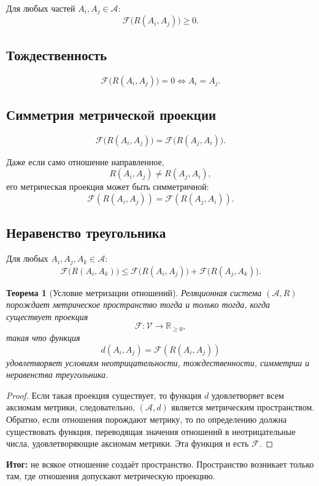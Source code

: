 \documentclass[12pt,a4paper]{article}
\newtheorem{theorem}{Теорема}[section]
\newcommand{\Parts}{\mathcal A}
\newcommand{\Rel}{R}
\newcommand{\Values}{\mathcal V}
\newcommand{\Metric}{\mathcal F}
\begin{document}
Для любых частей \(A_i,A_j\in\Parts\):
\[
\Metric\bigl(\Rel(A_i,A_j)\bigr)\ge0.
\]

\subsection{Тождественность}

\[
\Metric\bigl(\Rel(A_i,A_j)\bigr)=0
\Longleftrightarrow
A_i=A_j.
\]

\subsection{Симметрия метрической проекции}

\[
\Metric\bigl(\Rel(A_i,A_j)\bigr)
=
\Metric\bigl(\Rel(A_j,A_i)\bigr).
\]

Даже если само отношение направленное,
\[
\Rel(A_i,A_j)\neq\Rel(A_j,A_i),
\]
его метрическая проекция может быть симметричной:
\[
\Metric(\Rel(A_i,A_j))=\Metric(\Rel(A_j,A_i)).
\]

\subsection{Неравенство треугольника}

Для любых \(A_i,A_j,A_k\in\Parts\):
\[
\Metric\bigl(\Rel(A_i,A_k)\bigr)
\le
\Metric\bigl(\Rel(A_i,A_j)\bigr)
+
\Metric\bigl(\Rel(A_j,A_k)\bigr).
\]

\begin{theorem}[Условие метризации отношений]
Реляционная система \((\Parts,\Rel)\) порождает метрическое пространство тогда и только тогда, когда существует проекция
\[
\Metric:\Values\to\mathbb R_{\ge0},
\]
такая что функция
\[
d(A_i,A_j)=\Metric(\Rel(A_i,A_j))
\]
удовлетворяет условиям неотрицательности, тождественности, симметрии и неравенства треугольника.
\end{theorem}

\begin{proof}
Если такая проекция существует, то функция \(d\) удовлетворяет всем аксиомам метрики, следовательно, \((\Parts,d)\) является метрическим пространством. Обратно, если отношения порождают метрику, то по определению должна существовать функция, переводящая значения отношений в неотрицательные числа, удовлетворяющие аксиомам метрики. Эта функция и есть \(\Metric\).
\end{proof}

\textbf{Итог:} не всякое отношение создаёт пространство. Пространство возникает только там, где отношения допускают метрическую проекцию.
\end{document}
